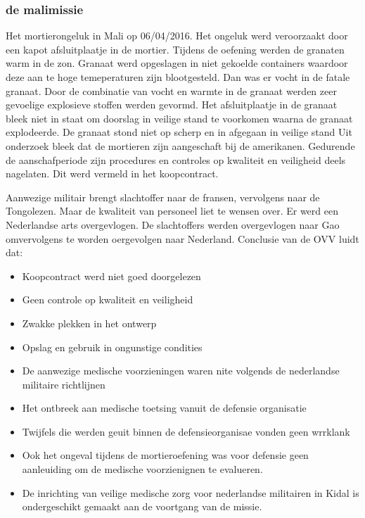 \documentclass{article}
\begin{document}
	\subsubsection{de malimissie}
	\newline \indent Het mortierongeluk in Mali op 06/04/2016. 
	Het ongeluk werd veroorzaakt door een kapot afsluitplaatje in de mortier.    Tijdens de oefening werden de granaten warm in de zon. 
	Granaat werd opgeslagen in niet  gekoelde containers waardoor deze aan te hoge temeperaturen zijn blootgesteld.  Dan was er vocht in de fatale granaat.
	Door de combinatie van vocht en warmte in de granaat werden zeer gevoelige explosieve stoffen werden gevormd.
	Het afsluitplaatje in de granaat bleek niet in staat om doorslag in veilige stand te voorkomen waarna de granaat explodeerde.
	De granaat stond niet op scherp en in afgegaan in veilige stand
	Uit onderzoek bleek dat de  mortieren zijn aangeschaft bij de amerikanen. Gedurende de aanschafperiode zijn procedures en controles op kwaliteit en veiligheid deels nagelaten.
	Dit  werd vermeld in het koopcontract.
	
	Aanwezige militair brengt slachtoffer naar de fransen, vervolgens naar de Tongolezen. Maar de kwaliteit van personeel liet te wensen over.
	Er werd een Nederlandse arts overgevlogen. De slachtoffers werden overgevlogen naar Gao omvervolgens te worden oergevolgen naar Nederland.
	Conclusie van de OVV\cite{bnnvara13062018malirapport}
	\cite{eucal11012021malimissieverlengd}
	\cite{nos21052014zorgenmalimissie}
	\cite{meijnders}
	\cite{bnrwebredactie}
	\cite{keultjes01062016malimissiecoalitie}
	\cite{veenhof18012019}
	\cite{isitman06012016militair}
	\cite{nporadio11072016filmdemissie}
	\cite{parlementairmonitor15122013mortierongeluk} luidt dat:
	\begin{itemize}
		\item Koopcontract werd niet goed doorgelezen
		\item Geen controle op kwaliteit en veiligheid
		\item Zwakke plekken in het ontwerp
		\item Opslag en gebruik in ongunstige condities
		\item De aanwezige medische voorzieningen waren nite volgends de nederlandse militaire richtlijnen
		\item Het ontbreek aan medische toetsing vanuit de defensie organisatie
		\item Twijfels die werden geuit binnen de defensieorganisae vonden geen wrrklank
		\item Ook het ongeval tijdens de mortieroefening was voor defensie geen aanleuiding om de medische voorzienignen te evalueren.
		\item De inrichting van veilige medische zorg voor nederlandse militairen in Kidal is ondergeschikt gemaakt aan de voortgang van de missie.
	\end{itemize}
	
\end{document}
